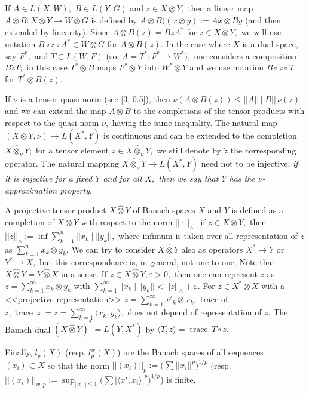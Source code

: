   If $A\in L(X,W),$ $B\in L(Y,G)$ and $z\in X\otimes Y,$ then  a linear map
  $A\otimes B: X\otimes Y\to W\otimes G$ is defined by
  $A\otimes B((x\otimes y):= Ax\otimes By$ (and then extended by linearity). Since
 $\widetilde{A\otimes B(z)}= B\widetilde z A^*$ for $z\in X\otimes Y,$ we will use notation
$B\circ z \circ A^*\in W\otimes G$ for $A\otimes B(z).$
In the case where $X$ is a dual space, say $F^*,$ and $T\in L(W,F)$
(so, $A=T^*: F^*\to W^*),$
one considers a composition $B\widetilde z T;$ in this case $T^*\otimes B$ maps
$F^*\otimes Y$ into $W^*\otimes Y$ and
we use notation
$B\circ z\circ T$ for $T^*\otimes B (z).$

If $\nu$ is a tensor quasi-norm (see [3, 0.5]),
then $\nu(A\otimes B (z))\leqslant ||A||\, ||B||\, \nu(z)$  and we can extend the map
$A\otimes B$ to the comple\-tions of the tensor products with respect to the quasi-norm
$\nu,$ having the same inequality. The natural map $(X\otimes Y, \nu)\to L(X^*, Y)$
is continuous and can be extended to the completion $\widehat{X\otimes_\nu Y};$ for
a tensor element $z\in \widehat{X\otimes_\nu Y},$ we still denote by $\widetilde z$ the corresponding
operator. The natural mapping
  $\widehat{X\otimes_\nu Y}\to L(X^*, Y)$  need not to be injective; {\it if it is injective
  for a fixed $Y$ and for all $X,$ then we say that $Y$ has the $\nu$-approximation property}.

A projective tensor product $X\widehat\otimes Y$ of Banach spaces $X$ and $Y$ is defined
as a completion of $X\otimes Y$ with respect to the norm $||\cdot||_{\land}:$
if $z\in X\otimes Y,$ then
$ ||z||_\land:= \inf \sum_{k=1}^n ||x_k||\, ||y_k||,
$
where infimum is taken over all representation of $z$ as $\sum_{k=1}^n x_k\otimes y_k.$
We can try to consider
    $X\widehat\otimes Y$ also as operators $X^*\to Y$ or $Y^*\to X,$ but this
    correspondence is, in general, not one-to-one.
Note that $X\widehat\otimes Y= Y\widehat\otimes X$ in a sense.
If $z\in X\widehat\otimes Y, \varepsilon>0,$ then one can represent $z$ as
$z=\sum_{k=1}^\infty x_k\otimes y_k$ with $\sum_{k=1}^\infty ||x_k||\, ||y_k||<||z||_\land+\varepsilon.$
For $z\in X^*\widehat\otimes X$ with a <<projective representation>> $z=\sum_{k=1}^\infty x'_k\otimes x_k,$
trace of $z, \operatorname{trace}\, z:=z=\sum_{k=1}^\infty \langle x_k, y_k\rangle,$ does not depend of representation of $z.$
The Banach dual $(X\widehat\otimes Y)^*= L(Y,X^*)$ by $\langle T, z\rangle=\operatorname{trace}\, T\circ z.$

Finally,
$l_p(X)$ (resp. $l^w_p(X)$) are the Banach spaces of all sequences  $(x_i)\subset X$ so that
the norm  $ ||(x_i)||_p:=\big(\sum ||x_i||^p\big)^{1/p}$
(resp. $||(x_i)||_{w,p}:= \sup_{||x'||\leqslant1}\big(\sum |\langle x', x_i\rangle|^p\big)^{1/p}$) is finite.

